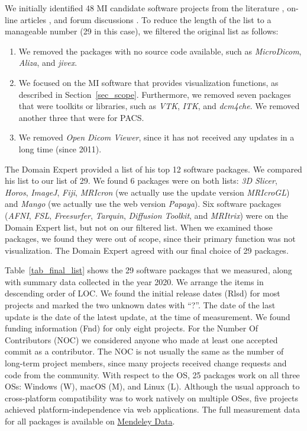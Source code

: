\documentclass[11pt]{article}
\begin{document}
We initially identified 48 MI candidate software projects \cite{Dong2021} from
the literature \cite{Bjorn2017, Bruhschwein2019, Haak2015}, on-line articles
\cite{Emms2019, Hasan2020, Mu2019}, and forum discussions \cite{Samala2014}.  To
reduce the length of the list to a manageable number (29 in this case), we
filtered the original list as follows:

\begin{enumerate}

\item We removed the packages with no source code available, such as
\textit{MicroDicom}, \textit{Aliza}, and \textit{jivex}.

\item We focused on the MI software that provides visualization functions, as
described in Section~\ref{sec_scope}. Furthermore, we removed seven packages
that were toolkits or libraries, such as \textit{VTK}, \textit{ITK}, and
\textit{dcm4che}.  We removed another three that were for PACS.

\item We removed \textit{Open Dicom Viewer}, since it has not received any
updates in a long time (since 2011).

\end{enumerate}

The Domain Expert provided a list of his top 12 software packages.  We compared
his list to our list of 29.  We found 6 packages were on both lists: \textit{3D
Slicer}, \textit{Horos}, \textit{ImageJ}, \textit{Fiji}, \textit{MRIcron} (we
actually use the update version \textit{MRIcroGL}) and \textit{Mango} (we
actually use the web version \textit{Papaya}).  Six software packages
(\textit{AFNI}, \textit{FSL}, \textit{Freesurfer}, \textit{Tarquin},
\textit{Diffusion Toolkit}, and \textit{MRItrix}) were on the Domain Expert
list, but not on our filtered list.  When we examined those packages,
we found they were out of scope, since their primary function was not
visualization.  The Domain Expert agreed with our final choice of 29 packages.

Table~\ref{tab_final_list} shows the 29 software packages that we measured,
along with summary data collected in the year 2020. We arrange the items in
descending order of LOC. We found the initial release dates (Rlsd) for most
projects and marked the two unknown dates with ``?''. The date of the last
update is the date of the latest update, at the time of measurement. We found
funding information (Fnd) for only eight projects.  For the Number Of
Contributors (NOC) we considered anyone who made at least one accepted commit as
a contributor. The NOC is not usually the same as the number of long-term
project members, since many projects received change requests and code from the
community.  With respect to the OS, 25 packages work on all three OSs: Windows
(W), macOS (M), and Linux (L). Although the usual approach to cross-platform
compatibility was to work natively on multiple OSes, five projects achieved
platform-independence via web applications. The full measurement data for all
packages is available on \href{https://data.mendeley.com/datasets/k3pcdvdzj2/1}
{Mendeley Data}.
\end{document}
